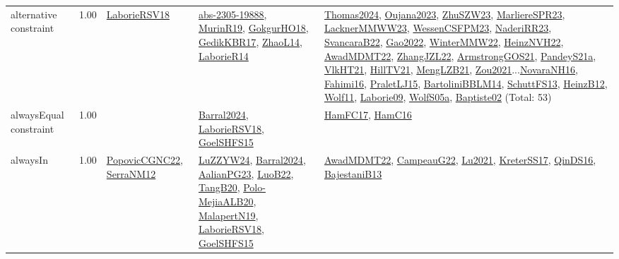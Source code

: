 {\begin{longtable}{p{3cm}r>{\raggedright\arraybackslash}p{6cm}>{\raggedright\arraybackslash}p{6cm}>{\raggedright\arraybackslash}p{8cm}}
\index{alternative constraint}\index{Constraints!alternative constraint}alternative constraint &  1.00 & \hyperref[detail:LaborieRSV18]{LaborieRSV18} & \hyperref[detail:abs-2305-19888]{abs-2305-19888}, \hyperref[detail:MurinR19]{MurinR19}, \hyperref[detail:GokgurHO18]{GokgurHO18}, \hyperref[detail:GedikKBR17]{GedikKBR17}, \hyperref[detail:ZhaoL14]{ZhaoL14}, \hyperref[detail:LaborieR14]{LaborieR14} & \hyperref[detail:Thomas2024]{Thomas2024}, \hyperref[detail:Oujana2023]{Oujana2023}, \hyperref[detail:ZhuSZW23]{ZhuSZW23}, \hyperref[detail:MarliereSPR23]{MarliereSPR23}, \hyperref[detail:LacknerMMWW23]{LacknerMMWW23}, \hyperref[detail:WessenCSFPM23]{WessenCSFPM23}, \hyperref[detail:NaderiRR23]{NaderiRR23}, \hyperref[detail:SvancaraB22]{SvancaraB22}, \hyperref[detail:Gao2022]{Gao2022}, \hyperref[detail:WinterMMW22]{WinterMMW22}, \hyperref[detail:HeinzNVH22]{HeinzNVH22}, \hyperref[detail:AwadMDMT22]{AwadMDMT22}, \hyperref[detail:ZhangJZL22]{ZhangJZL22}, \hyperref[detail:ArmstrongGOS21]{ArmstrongGOS21}, \hyperref[detail:PandeyS21a]{PandeyS21a}, \hyperref[detail:VlkHT21]{VlkHT21}, \hyperref[detail:HillTV21]{HillTV21}, \hyperref[detail:MengLZB21]{MengLZB21}, \hyperref[detail:Zou2021]{Zou2021}...\hyperref[detail:NovaraNH16]{NovaraNH16}, \hyperref[detail:Fahimi16]{Fahimi16}, \hyperref[detail:PraletLJ15]{PraletLJ15}, \hyperref[detail:BartoliniBBLM14]{BartoliniBBLM14}, \hyperref[detail:SchuttFS13]{SchuttFS13}, \hyperref[detail:HeinzB12]{HeinzB12}, \hyperref[detail:Wolf11]{Wolf11}, \hyperref[detail:Laborie09]{Laborie09}, \hyperref[detail:WolfS05a]{WolfS05a}, \hyperref[detail:Baptiste02]{Baptiste02} (Total: 53)\\
\index{alwaysEqual constraint}\index{Constraints!alwaysEqual constraint}alwaysEqual constraint &  1.00 &  & \hyperref[detail:Barral2024]{Barral2024}, \hyperref[detail:LaborieRSV18]{LaborieRSV18}, \hyperref[detail:GoelSHFS15]{GoelSHFS15} & \hyperref[detail:HamFC17]{HamFC17}, \hyperref[detail:HamC16]{HamC16}\\
\index{alwaysIn}\index{Constraints!alwaysIn}alwaysIn &  1.00 & \hyperref[detail:PopovicCGNC22]{PopovicCGNC22}, \hyperref[detail:SerraNM12]{SerraNM12} & \hyperref[detail:LuZZYW24]{LuZZYW24}, \hyperref[detail:Barral2024]{Barral2024}, \hyperref[detail:AalianPG23]{AalianPG23}, \hyperref[detail:LuoB22]{LuoB22}, \hyperref[detail:TangB20]{TangB20}, \hyperref[detail:Polo-MejiaALB20]{Polo-MejiaALB20}, \hyperref[detail:MalapertN19]{MalapertN19}, \hyperref[detail:LaborieRSV18]{LaborieRSV18}, \hyperref[detail:GoelSHFS15]{GoelSHFS15} & \hyperref[detail:AwadMDMT22]{AwadMDMT22}, \hyperref[detail:CampeauG22]{CampeauG22}, \hyperref[detail:Lu2021]{Lu2021}, \hyperref[detail:KreterSS17]{KreterSS17}, \hyperref[detail:QinDS16]{QinDS16}, \hyperref[detail:BajestaniB13]{BajestaniB13}\\

\end{longtable}}
